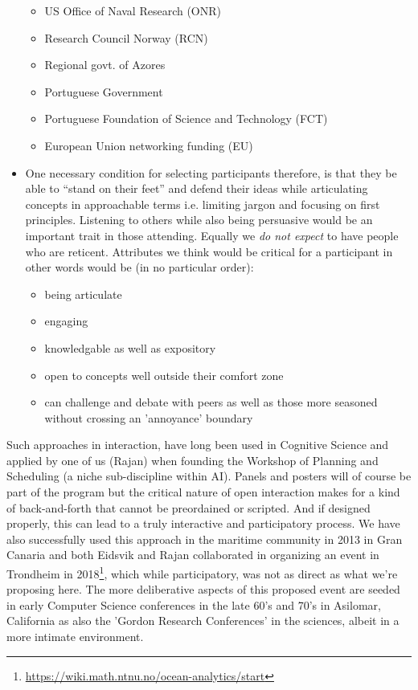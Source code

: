\documentclass[10pt,letterpaper]{article}
\begin{document}
\begin{itemize}
\begin{itemize}
  \item US Office of Naval Research (ONR)
  \item Research Council Norway (RCN)
  \item Regional govt. of Azores
  \item Portuguese Government
  \item Portuguese Foundation of Science and Technology (FCT)
  \item European Union networking funding (EU)

  \end{itemize}

\item One necessary condition for selecting participants therefore, is
  that they be able to ``stand on their feet'' and defend their ideas
  while articulating concepts in approachable terms i.e. limiting
  jargon and focusing on first principles. Listening to others while
  also being persuasive would be an important trait in those
  attending. Equally we \emph{do not expect} to have people who are
  reticent. Attributes we think would be critical for a participant in
  other words would be (in no particular order):

  \begin{itemize}

  \item being articulate
  \item engaging
  \item knowledgable as well as expository
  \item open to concepts well outside their comfort zone
  \item can challenge and debate with peers as well as those more
    seasoned without crossing an 'annoyance' boundary

  \end{itemize}

\end{itemize}  

\noindent
Such approaches in interaction, have long been used in Cognitive
Science and applied by one of us (Rajan) when founding the \nas
Workshop of Planning and Scheduling (a niche sub-discipline within
AI). Panels and posters will of course be part of the program but the
critical nature of open interaction makes for a kind of back-and-forth
that cannot be preordained or scripted. And if designed properly, this
can lead to a truly interactive and participatory process. We have
also successfully used this approach in the maritime community in 2013
in Gran Canaria and both Eidsvik and Rajan collaborated in organizing
an event in Trondheim in
2018\footnote{\url{https://wiki.math.ntnu.no/ocean-analytics/start}},
which while participatory, was not as direct as what we're proposing
here. The more deliberative aspects of this proposed event are seeded
in early Computer Science conferences in the late 60's and 70's in
Asilomar, California as also the 'Gordon Research Conferences' in the
sciences, albeit in a more intimate environment.



\newpage


\renewcommand{\thepage}{}
\end{document}
